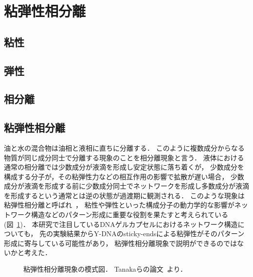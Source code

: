 \section{粘弾性相分離}

\subsection{粘性}

\subsection{弾性}

\subsection{相分離}

\subsection{粘弾性相分離}
油と水の混合物は油相と液相に直ちに分離する．
このように複数成分からなる物質が同じ成分同士で分離する現象のことを相分離現象と言う．
液体における通常の相分離では少数成分が液滴を形成し安定状態に落ち着くが，
少数成分を構成する分子が，その粘弾性力などの相互作用の影響で拡散が遅い場合，
少数成分が液滴を形成する前に少数成分同士でネットワークを形成し多数成分が液滴を形成するという通常とは逆の状態が過渡期に観測される．
このような現象は粘弾性相分離と呼ばれ~\cite{tanaka2009formation}，
粘性や弾性といった構成分子の動力学的な影響がネットワーク構造などのパターン形成に重要な役割を果たすと考えられている(図~\ref{fig:veps})．
本研究で注目しているDNAゲルカプセルにおけるネットワーク構造についても，
先の実験結果からY-DNAのsticky-endsによる粘弾性がそのパターン形成に寄与している可能性があり，
粘弾性相分離現象で説明ができるのではないかと考えた．

\begin{figure}
\centering

\caption{
    粘弾性相分離現象の模式図．
    Tanakaらの論文~\cite{tanaka2009formation}より．
}

\label{fig:veps}
\end{figure}
